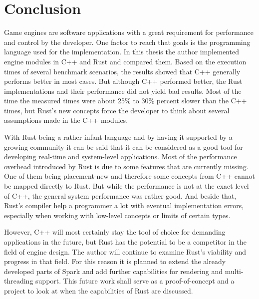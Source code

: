 \chapter{Conclusion}

Game engines are software applications with a great requirement for performance and control by the developer. One factor to reach that goals is the programming language used for the implementation. In this thesis the author implemented engine modules in C++ and Rust and compared them. Based on the execution times of several benchmark scenarios, the results showed that C++ generally performs better in most cases. But although C++ performed better, the Rust implementations and their performance did not yield bad results. Most of the time the measured times were about 25\% to 30\% percent slower than the C++ times, but Rust's new concepts force the developer to think about several assumptions made in the C++ modules.

With Rust being a rather infant language and by having it supported by a growing community it can be said that it can be considered as a good tool for developing real-time and system-level applications. Most of the performance overhead introduced by Rust is due to some features that are currently missing. One of them being placement-new and therefore some concepts from C++ cannot be mapped directly to Rust. But while the performance is not at the exact level of C++, the general system performance was rather good. And beside that, Rust's compiler help a programmer a lot with eventual implementation errors, especially when working with low-level concepts or limits of certain types. 

However, C++ will most certainly stay the tool of choice for demanding applications in the future, but Rust has the potential to be a competitor in the field of engine design. The author will continue to examine Rust's viability and progress in that field. For this reason it is planned to extend the already developed parts of Spark and add further capabilities for rendering and multi-threading support. This future work shall serve as a proof-of-concept and a project to look at when the capabilities of Rust are discussed. 